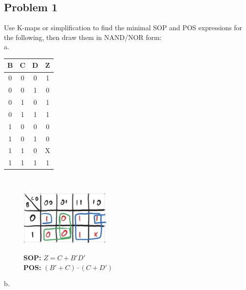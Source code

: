 \documentclass{article}
\begin{document}
\subsection*{Problem 1}
Use K-maps or simplification to find the minimal SOP and POS expressions for the following, then draw them in NAND/NOR form:\\

a. 
    \begin{table}[!h]
    \centering
\begin{tabular}{|c|c|c|c|}
\hline
\textbf{B} & \textbf{C} & \textbf{D} & \textbf{Z} \\ \hline 
0          & 0          & 0          & 1          \\ \hline 
0          & 0          & 1          & 0          \\ \hline 
0          & 1          & 0          & 1          \\ \hline 
0          & 1          & 1          & 1          \\ \hline 
1          & 0          & 0          & 0          \\ \hline 
1          & 0          & 1          & 0          \\ \hline 
1          & 1          & 0          & X          \\ \hline 
1          & 1          & 1          & 1          \\ \hline
\end{tabular}
\end{table} \\
\begin{figure}[!h]
\centering
\includegraphics[width=0.4\textwidth]{figures/kmap1a_solution.png} \\
\caption*{\textbf{SOP: } $Z=C+B'D'$ \\
\textbf{POS: } $(B'+C)\cdot(C+D')$ \\}
\end{figure}
\newpage
b.
\end{document}
